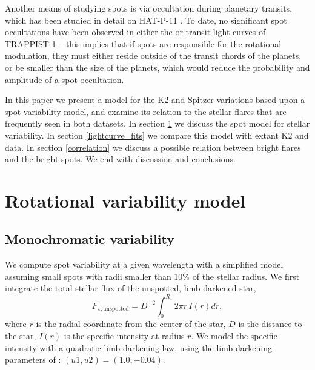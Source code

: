 Another means of studying spots is via occultation during planetary transits, which has been studied in detail on HAT-P-11 \citep{Morris2017a}. To date, no significant spot occultations have been observed in either the \kepler or \spitzer transit light curves of TRAPPIST-1 \citep{Delrez2018} -- this implies that if spots are responsible for the rotational modulation, they must either reside outside of the transit chords of the planets, or be smaller than the size of the planets, which would reduce the probability and amplitude of a spot occultation.

In this paper we present a model for the K2 and Spitzer variations based upon a spot variability
model, and examine its relation to the stellar flares that are frequently seen in both datasets.
In section \ref{rotation_model} we discuss the spot model for stellar variability.  In section
\ref{lightcurve_fits} we compare this model with extant K2 and \spitzer data.  In section
\ref{correlation} we discuss a possible relation between bright flares and the bright spots.
We end with discussion and conclusions.


\section{Rotational variability model} \label{rotation_model}

\subsection{Monochromatic variability}

We compute spot variability at a given wavelength with
a simplified model assuming small spots with radii smaller than
10\% of the stellar radius.
We first integrate the total stellar flux of the unspotted, limb-darkened star,
\begin{equation}
F_{\star, \mathrm{unspotted}} = D^{-2} \int_{0}^{R_\star} 2 \pi r \, I(r) dr,
\end{equation}
where $r$ is the radial coordinate from the center of the star, $D$ is
the distance to the star, $I(r)$ is the specific intensity at radius $r$.  
We model the specific intensity with a quadratic limb-darkening law, using 
the limb-darkening parameters of \citet{Luger2017}: $(u1, u2) = (1.0, -0.04)$. 

